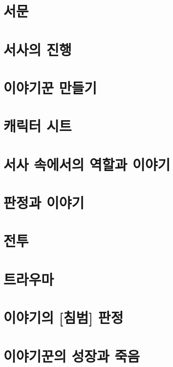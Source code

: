 \documentclass{report}
\begin{document}
	\parttoc
	
	\chapter{서문}
		
	
	\hypertarget{story-progression}{}
	\chapter{서사의 진행}
		
	
	\chapter{이야기꾼 만들기}
		
	
	\hypertarget{sheets}{}
	\chapter{캐릭터 시트}
		
	
	\chapter{서사 속에서의 역할과 이야기}
		
	
	\chapter{판정과 이야기}
		
	
	\chapter{전투}
		
	
	\hypertarget{trauma}{}
	\chapter{트라우마}
		
	
	\hypertarget{intrusion}{}
	\chapter{이야기의 [침범] 판정}
		
	
	\hypertarget{growth}{}
	\chapter{이야기꾼의 성장과 죽음}
		
	
\end{document}
